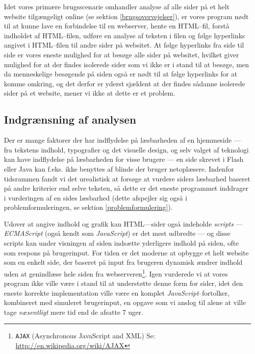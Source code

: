 \documentclass[a4paper,oneside]{memoir}
\begin{document}
Idet vores primære brugsscenarie omhandler analyse af alle sider på et
helt website tilgængeligt online (se sektion \ref{brugsovervejelser}),
er vores program nødt til at kunne lave en
forbindelse til en webserver, hente en HTML--fil, forstå indholdet af
HTML--filen, udføre en analyse af teksten i filen og følge hyperlinks
angivet i HTML--filen til andre sider på websitet. At følge hyperlinks
fra side til side er vores eneste mulighed for at besøge alle sider på
websitet, hvilket giver mulighed for at der findes isolerede sider som
vi ikke er i stand til at besøge, men da menneskelige besøgende på
siden også er nødt til at følge hyperlinks for at komme omkring, og
det derfor er yderst sjældent at der findes sådanne isolerede sider på et
website, mener vi ikke at dette er et problem.

\subsection{Indgrænsning af analysen}
\label{begraensning}
Der er mange faktorer der har indflydelse på læsbarheden af en
hjemmeside --- fra tekstens indhold, typografier og det visuelle
design, og selv valget af teknologi kan have indflydelse på
læsbarheden for visse brugere --- en side skrevet i Flash eller Java
kan f.eks. ikke benyttes af blinde der bruger netoplæsere. Indenfor
tidsrammen fandt vi det urealistisk at forsøge at vurdere siders
læsbarhed baseret på andre kriterier end selve teksten, så dette er
det eneste programmet inddrager i vurderingen af en sides læsbarhed
(dette afspejler sig også i problemformuleringen, se sektion
\ref{problemformulering}).

Udover at angive indhold og grafik kan HTML---sider også indeholde
\textit{scripts} --- \textit{ECMAScript} (også kendt som
\textit{JavaScript}) er det mest udbredte --- og disse scripts kan
under visningen af siden indsætte yderligere indhold på siden, ofte
som respons på brugerinput. For tiden er det moderne at opbygge et
helt website som en enkelt side, der baseret på input fra brugeren
dynamisk ændrer indhold uden at genindlæse hele siden fra
webserveren\footnote{\texttt{AJAX} (Asynchronous JavaScript and XML)
  Se: \url{http://en.wikipedia.org/wiki/AJAX}}. Igen vurderede vi at
vores program ikke ville være i stand til at understøtte denne form
for sider, idet den eneste korrekte implementation ville være en
komplet \textit{JavaScript}--fortolker, kombineret med simuleret
brugerinput, en opgave som vi anslog til alene at ville tage
\textit{væsentligt} mere tid end de afsatte 7 uger.
\end{document}
